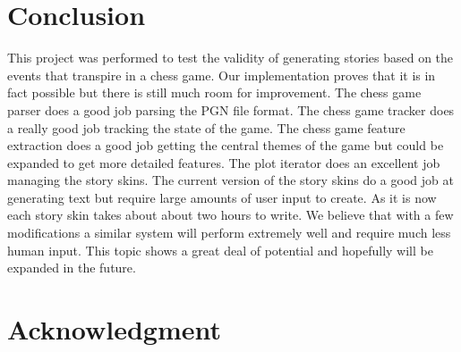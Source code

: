 \documentclass[journal]{./IEEEtran}
\begin{document}
\section{Conclusion}
This project was performed to test the validity of generating stories based on the events that transpire in a chess game. Our implementation proves that it is in fact possible but there is still much room for improvement. The chess game parser does a good job parsing the PGN file format. The chess game tracker does a really good job tracking the state of the game. The chess game feature extraction does a good job getting the central themes of the game but could be expanded to get more detailed features. The plot iterator does an excellent job managing the story skins. The current version of the story skins do a good job at generating text but require large amounts of user input to create. As it is now each story skin takes about about two hours to write.  We believe that with a few modifications a similar system will perform extremely well and require much less human input. This topic shows a great deal of potential and hopefully will be expanded in the future.

\section{Acknowledgment}



\end{document}
